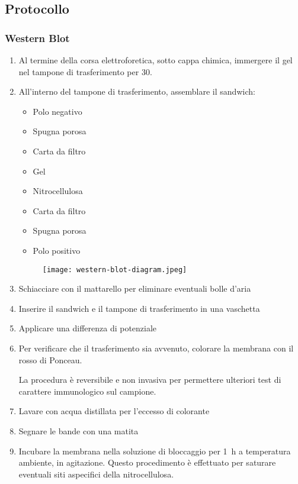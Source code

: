 \subsection{Protocollo}
\subsubsection{Western Blot}
\begin{enumerate}
	\item Al termine della corsa elettroforetica, sotto cappa chimica, immergere il gel nel tampone di trasferimento per \qty{30}{\sec}.
	\item All’interno del tampone di trasferimento, assemblare il sandwich:

	      \begin{minipage}[b]{0.35\textwidth}
		      \begin{itemize}[person]
			      \item Polo negativo
			      \item Spugna porosa
			      \item Carta da filtro
			      \item Gel
			      \item Nitrocellulosa
			      \item Carta da filtro
			      \item Spugna porosa
			      \item Polo positivo
		      \end{itemize}
	      \end{minipage}
	      \begin{minipage}[b]{0.6\textwidth}
		      \begin{figure}[H]
			      \texttt{[image: western-blot-diagram.jpeg]}
		      \end{figure}
	      \end{minipage}

	\item Schiacciare con il mattarello per eliminare eventuali bolle d’aria
	\item Inserire il sandwich e il tampone di trasferimento in una vaschetta
	\item Applicare una differenza di potenziale
	\item Per verificare che il trasferimento sia avvenuto, colorare la membrana con il rosso di Ponceau.
	      \begin{Note}
		      La procedura è reversibile e non invasiva per permettere ulteriori test di carattere immunologico sul campione.
	      \end{Note}
	\item Lavare con acqua distillata per l'eccesso di colorante
	\item Segnare le bande con una matita
	\item Incubare la membrana nella soluzione di bloccaggio per \qty{1}{\hour} a temperatura ambiente, in agitazione. Questo procedimento è effettuato per saturare eventuali siti aspecifici della nitrocellulosa.


\end{enumerate}
